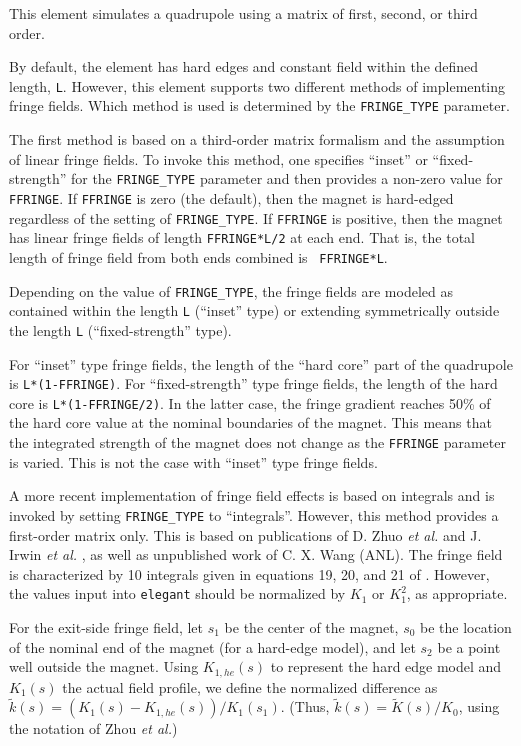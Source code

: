 This element simulates a quadrupole using a matrix of first, second,
or third order.

By default, the element has hard edges and constant field within the
defined length, {\tt L}.  However, this element supports two different methods of implementing fringe fields.
Which method is used is determined by the \verb|FRINGE_TYPE| parameter.

The first method is based on a third-order matrix formalism and the assumption of
linear fringe fields.  To invoke this method, one specifies ``inset'' or
``fixed-strength'' for the \verb|FRINGE_TYPE| parameter and then provides
a non-zero value for {\tt FFRINGE}. If  {\tt FFRINGE} is zero (the default), then the magnet
is hard-edged regardless of the setting of \verb|FRINGE_TYPE|.  If {\tt FFRINGE} is positive, then the magnet has
linear fringe fields of length {\tt FFRINGE*L/2} at each end.  That
is, the total length of fringe field from both ends combined is {\tt
FFRINGE*L}.

Depending on the value of {\tt FRINGE\_TYPE}, the fringe fields are
modeled as contained within the length {\tt L} (``inset'' type) or
extending symmetrically outside the length {\tt L} (``fixed-strength''
type).

For ``inset'' type fringe fields, the length of the ``hard core'' part of
the quadrupole is {\tt L*(1-FFRINGE)}.  For ``fixed-strength'' type fringe fields,
the length of the hard core is {\tt L*(1-FFRINGE/2)}.  In the latter case,
the fringe gradient reaches 50\% of the hard core value at the nominal boundaries
of the magnet. This means that the integrated strength of the magnet does not
change as the {\tt FFRINGE} parameter is varied. This is not the case with
``inset'' type fringe fields.

A more recent implementation of fringe field effects is based on integrals and is invoked
by setting \verb|FRINGE_TYPE| to ``integrals''.  However, this method provides a first-order matrix only.
This is based on publications of D.  Zhuo {\em et al.} \cite{Zhou-IPAC10} and  J. Irwin {\em et
  al.} \cite{Irwin-PAC95}, as well as unpublished work of C. X. Wang (ANL).  The fringe field is characterized by 
10 integrals given in equations 19, 20, and 21 of \cite{Zhou-IPAC10}.  However, the values input into {\tt elegant}
should be normalized by $K_1$ or $K_1^2$, as appropriate.

For the exit-side fringe field, let $s_1$ be the center of the magnet, $s_0$ be the location of the nominal end of the magnet
(for a hard-edge model), and let $s_2$ be a point well outside the magnet.  
Using $K_{1,he}(s)$ to represent the hard edge model and $K_1(s)$ the actual field profile, we 
define the normalized difference as $\tilde{k}(s) = (K_1(s) - K_{1,he}(s))/K_1(s_1)$.  (Thus, $\tilde{k}(s) = \tilde{K}(s)/K_0$, using
the notation of Zhou {\em et al.})

